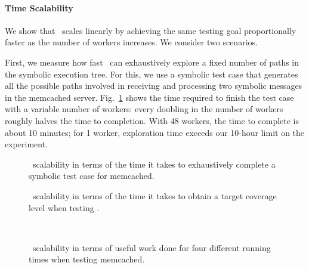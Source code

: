 \paragraph{Time Scalability} We show that \cnine\ scales linearly by achieving the same testing goal proportionally faster as the number of workers increases. We consider two scenarios.

First, we measure how fast \cnine\ can exhaustively explore a fixed number of paths in the symbolic execution tree.  For this, we use a symbolic test case that generates all the possible paths involved in receiving and processing two symbolic messages in the memcached server.  Fig.~\ref{fig:scalab-time-vs-workers} shows the time required to finish the test case with a variable number of workers: every doubling in the number of workers roughly halves the time to completion.  With 48 workers, the time to complete is about 10 minutes; for 1 worker,  exploration time exceeds our 10-hour limit on the experiment.  


\begin{figure}[h!]
  \centering
  \caption{\cnine\ scalability in terms of the time it takes to exhaustively complete a symbolic test case for memcached.}
  \label{fig:scalab-time-vs-workers}
\end{figure}

\begin{figure}[h!]
  \centering
  \caption{\cnine\ scalability in terms of the time it takes to obtain a target coverage level when testing .}
  \label{fig:scalab-time-vs-workers-cov}
\end{figure}

\begin{figure}[t!]
  \centering
   \\
  \caption{\cnine\ scalability in terms of useful work done for four different running times when testing memcached.}
  \label{fig:scalab-memcached}
\end{figure}

